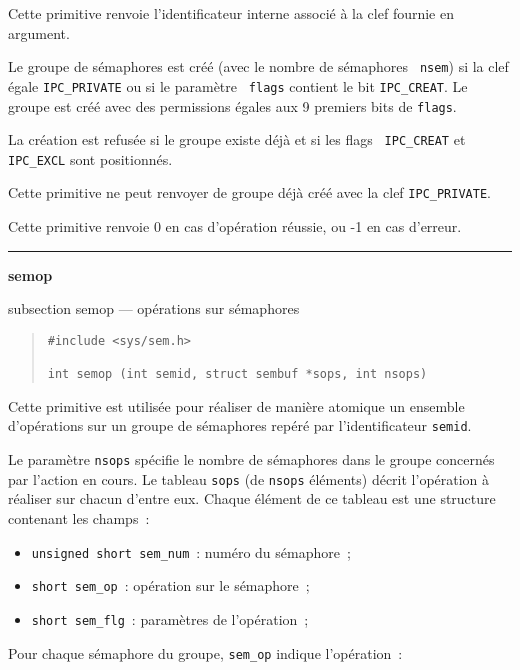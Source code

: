 \documentclass [twoside] {report}
\newcommand {\primitive} [1]
    {
	{\large \bf #1}
	\addcontentsline {toc} {subsection} {#1}
    }
\newcommand {\separation}
    {
	\vspace {7mm}
	\nopagebreak
	\hrule
    }
\begin{document}
Cette primitive renvoie l'identificateur interne associé à la clef
fournie en argument.

Le groupe de sémaphores est créé (avec le nombre de sémaphores {\tt
nsem}) si la clef égale {\tt IPC\_PRIVATE} ou si le paramètre {\tt
flags} contient le bit {\tt IPC\_CREAT}.  Le groupe est créé avec des
permissions égales aux 9 premiers bits de {\tt flags}.

La création est refusée si le groupe existe déjà et si les flags {\tt
IPC\_CREAT} et {\tt IPC\_EXCL} sont positionnés.

Cette primitive ne peut renvoyer de groupe déjà créé avec la clef
{\tt IPC\_PRIVATE}.

Cette primitive renvoie 0 en cas d'opération
réussie, ou -1 en cas d'erreur.


\separation
\primitive {semop} --- opérations sur sémaphores

\begin {quote}
\begin {verbatim}
#include <sys/sem.h>

int semop (int semid, struct sembuf *sops, int nsops)
\end{verbatim}
\end {quote}

Cette primitive est utilisée pour réaliser de manière atomique un
ensemble d'opérations sur un groupe de sémaphores repéré par
l'identificateur {\tt semid}.

Le paramètre {\tt nsops} spécifie le nombre de sémaphores dans le groupe
concernés par l'action en cours.  Le tableau {\tt sops} (de {\tt nsops}
éléments) décrit l'opération à réaliser sur chacun d'entre eux.  Chaque
élément de ce tableau est une structure contenant les champs~:

\begin {itemize}
    \item {\tt unsigned short sem\_num}~: numéro du sémaphore~;
    \item {\tt short sem\_op}~: opération sur le sémaphore~;
    \item {\tt short sem\_flg}~: paramètres de l'opération~;
\end {itemize}

Pour chaque sémaphore du groupe, {\tt sem\_op} indique l'opération~:
\end{document}
